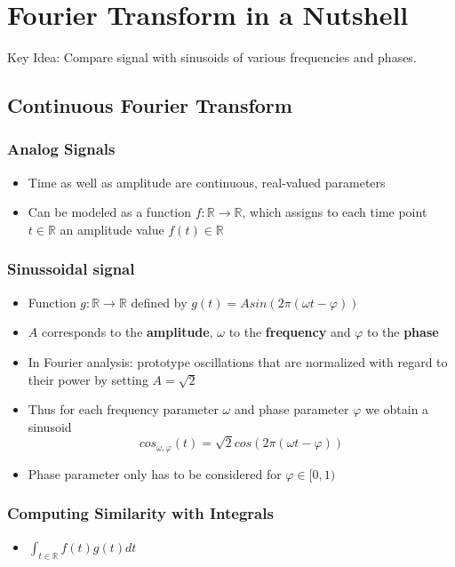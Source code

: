 \documentclass{scrartcl}
\begin{document}
 
\tableofcontents
\newpage

\section{Fourier Transform in a Nutshell}
Key Idea: Compare signal with sinusoids of various frequencies and phases. 

\subsection{Continuous Fourier Transform}
\subsubsection*{Analog Signals}
\begin{itemize}
    \item
        Time as well as amplitude are continuous, real-valued parameters
    \item
        Can be modeled as a function $f: \mathbb{R} \rightarrow \mathbb{R}$, which assigns to each time point $t \in \mathbb{R}$ an amplitude value $f(t) \in \mathbb{R}$
\end{itemize}
\subsubsection*{Sinussoidal signal}
\begin{itemize}
    \item
        Function $g: \mathbb{R} \rightarrow \mathbb{R}$ defined by $g(t) = A sin(2\pi(\omega t - \varphi))$
    \item
        $A$ corresponds to the \textbf{amplitude}, $\omega$ to the \textbf{frequency} and $\varphi$ to the \textbf{phase}
    \item
        In Fourier analysis: prototype oscillations that are normalized with regard to their power by setting $A = \sqrt2$
    \item
        Thus for each frequency parameter $\omega$ and phase parameter $\varphi$ we obtain a sinusoid 
        $$cos_{\omega, \varphi}(t) = \sqrt2 cos(2\pi(\omega t - \varphi))$$
    \item
        Phase parameter only has to be considered for $\varphi \in [0, 1)$
\end{itemize}
\subsubsection*{Computing Similarity with Integrals}
\begin{itemize}
    \item
        $\int_{t \in \mathbb{R}} f(t)g(t) dt$
\end{itemize}
\end{document}
